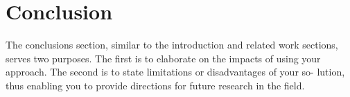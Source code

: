 
\chapter{Conclusion}
\label{chap:conclusion}

The conclusions section, similar to the introduction and
related work sections, serves two purposes. The first is
to elaborate on the impacts of using your approach. The
second is to state limitations or disadvantages of your so-
lution, thus enabling you to provide directions for future
research in the field.
